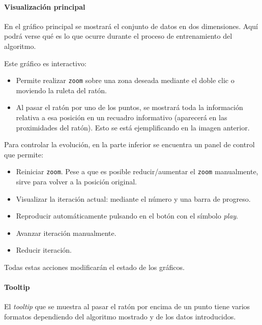 
\paragraph{Visualización principal} En el gráfico principal se mostrará el
conjunto de datos en dos dimensiones. Aquí podrá verse qué es lo que ocurre
durante el proceso de entrenamiento del algoritmo.


Este gráfico es interactivo:
\begin{itemize}
    \item Permite realizar \texttt{zoom} sobre una zona deseada mediante el
    doble clic o moviendo la ruleta del ratón.
    \item Al pasar el ratón por uno de los puntos, se mostrará toda la
    información relativa a esa posición en un recuadro informativo (aparecerá en
    las proximidades del ratón). Esto se está ejemplificando en la imagen
    anterior.
\end{itemize}

Para controlar la evolución, en la parte inferior se encuentra un panel de
control que permite:
\begin{itemize}
    \item Reiniciar \texttt{zoom}. Pese a que es posible reducir/aumentar el
    \texttt{zoom} manualmente, sirve para volver a la posición original.
    \item Visualizar la iteración actual: mediante el número y una barra de
    progreso.
    \item Reproducir automáticamente pulsando en el botón con el símbolo
    \textit{play}.
    \item Avanzar iteración manualmente.
    \item Reducir iteración.
\end{itemize}

Todas estas acciones modificarán el estado de los gráficos.

\paragraph{Tooltip} El \textit{tooltip} que se muestra al pasar el ratón por
encima de un punto tiene varios formatos dependiendo del algoritmo mostrado y de
los datos introducidos.

